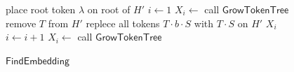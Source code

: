 \documentclass[master]{kuisthesis}		%
\theoremstyle{plain}
\theoremstyle{definition}
\begin{document}

\begin{figure}[!t]
\begin{algorithm}[H]
    \caption{$\mathsf{FindEmbedding}$}
	\label{findEmbedding}
	\begin{algorithmic}[1]
    \STATE place root token $\lambda$ on root of $H'$
    \STATE $i \leftarrow 1$
    \STATE $X_i  \leftarrow$ call $\mathsf{GrowTokenTree}$
    \STATE remove $T$ from $H'$
    \STATE replece all tokens $T \cdot b \cdot S$ with $T \cdot S$ on $H'$
    \ENDIF
    \ELSE
    \RETURN $X_i$
    \ENDIF
    \STATE $i \leftarrow i+1$
    \STATE $X_i \leftarrow$ call $\mathsf{GrowTokenTree}$
    \ENDWHILE
	\end{algorithmic}
\end{algorithm}
\end{figure}
\end{document}
